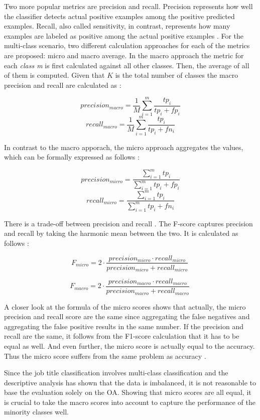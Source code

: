 \documentclass[12pt, a4paper, titlepage]{article}
\begin{document}
Two more popular metrics are precision and recall. Precision represents how well the classifier detects actual positive examples among the positive predicted examples. Recall, also called sensitivity, in contrast, represents how many examples are labeled as positive among the actual positive examples \citep{Berthold2020}. For the multi-class scenario, two different calculation approaches for each of the metrics are proposed: micro and macro average. In the macro approach the metric for each \textit{class m} is first calculated against all other classes. Then, the average of all of them is computed. Given that $K$ is the total number of classes the macro precision and recall are calculated as \citep{Branco2017}:

\[precision_{macro} = \frac{1}{M} \sum_{i=1}^m \frac{tp_{i}}{tp_{i} + fp_{i}}\]
\[recall_{macro} = \frac{1}{M} \sum_{i=1}^m \frac{tp_{i}}{tp_{i} + fn_{i}}\]

In contrast to the macro apporach, the micro approach aggregates the values, which can be formally expressed as follows \citep{Branco2017}: 

\[precision_{micro} = \frac{\sum_{i=1}^m tp_i}{\sum_{i=1}^m tp_i + fp_i}\]
\[recall_{micro} = \frac{\sum_{i=1}^m tp_i}{\sum_{i=1}^m tp_i + fn_i}\]

There is a trade-off between precision and recall \citep{Buckland1994}. The F-score captures precision and recall by taking the harmonic mean between the two. It is calculated as follows \citep{Branco2017,Pan2016}:  

\[F_{micro} = 2 \cdot \frac{precision_{micro} \cdot recall_{micro} }{precision_{micro} + recall_{micro} }\ \]

\[F_{macro} = 2 \cdot \frac{precision_{macro} \cdot recall_{macro} }{precision_{macro} + recall_{macro} }\ \]

A closer look at the formula of the micro scores shows that actually, the micro precision and recall score are the same since aggregating the false negatives and aggregating the false positive results in the same number. If the precision and recall are the same, it follows from the F1-score calculation that it has to be equal as well. And even further, the micro score is actually equal to the accuracy. Thus the micro score suffers from the same problem as accuracy \citep{grandini2020}.

Since the job title classification involves multi-class classification and the descriptive analysis has shown that the data is imbalanced, it is not reasonable to base the evaluation solely on the \ac{OA}. Showing that micro scores are all equal, it is crucial to take the macro scores into account to capture the performance of the minority classes well.
\end{document}
